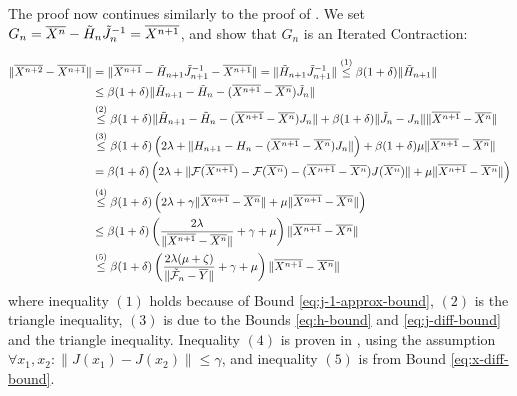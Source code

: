 \documentclass[nohyperref]{article}
\begin{document}
The proof now continues similarly to the proof of \citet[12.3.3]{ortega2000iterative}. We set $G_n=\overline{X^n}-\Tilde{H}_n \Tilde{J}^{-1}_n =\overline{X^{n+1}}$, and show that $G_n$ is an Iterated Contraction:

\begin{align*}
    \| \overline{X^{n+2}} - \overline{X^{n+1}} \| &= \| \overline{X^{n+1}} - \Tilde{H}_{n+1} \Tilde{J}_{n+1}^{-1} - \overline{X^{n+1}}\| = \| \Tilde{H}_{n+1} \Tilde{J}^{-1}_{n+1} \| \overset{(1)}{\leq}  \beta(1+\delta) \| \Tilde{H}_{n+1} \| \\
    &\leq \beta(1+\delta) \| \Tilde{H}_{n+1} - \Tilde{H}_n - (\overline{X^{n+1}} - \overline{X^n})\Tilde{J}_n  \| \\
    &\overset{(2)}{\leq} \beta(1+\delta) \| \Tilde{H}_{n+1} - \Tilde{H}_n - (\overline{X^{n+1}} - \overline{X^n})J_n  \| + \beta(1+\delta) \| \Tilde{J}_n - J_n \| \| \overline{X^{n+1}} - \overline{X^n} \|\\
    &\overset{(3)}{\leq} \beta(1+\delta) \left(2\lambda + \| H_{n+1} - H_n - (\overline{X^{n+1}} - \overline{X^n})J_n  \|\right) + \beta(1+\delta) \mu \| \overline{X^{n+1}} - \overline{X^n} \|\\
    &= \beta(1+\delta) \left(2\lambda + \| \mathcal{F}(\overline{X^{n+1}}) - \mathcal{F}(\overline{X^n}) - (\overline{X^{n+1}} - \overline{X^n})J(\overline{X^n})  \| + \mu \| \overline{X^{n+1}} - \overline{X^n} \|\right)\\
    &\overset{(4)}{\leq} \beta(1+\delta) \left(2\lambda + \gamma \| \overline{X^{n+1}} - \overline{X^n} \| + \mu \| \overline{X^{n+1}} - \overline{X^n} \|\right)\\
    &\leq \beta(1+\delta) \left(\frac{2\lambda}{\| \overline{X^{n+1}} - \overline{X^n} \|} + \gamma + \mu \right)\| \overline{X^{n+1}} - \overline{X^n} \|\\
    &\overset{(5)}{\leq} \beta(1+\delta) \left(\frac{2\lambda(\mu + \zeta)}{\| \Tilde{\mathcal{F}}_n - \overline{Y} \|} + \gamma + \mu \right)\| \overline{X^{n+1}} - \overline{X^n} \|
\end{align*}
where inequality $(1)$ holds because of Bound \ref{eq:j-1-approx-bound}, $(2)$ is the triangle inequality, $(3)$ is due to the Bounds \ref{eq:h-bound} and \ref{eq:j-diff-bound} and the triangle inequality. Inequality $(4)$ is proven in \citet[3.2.12]{ortega2000iterative}, {using the assumption $\forall x_1,x_2: \|J(x_1)-J(x_2)\|\leq \gamma$}, and inequality $(5)$ is from Bound \ref{eq:x-diff-bound}.  
\end{document}
